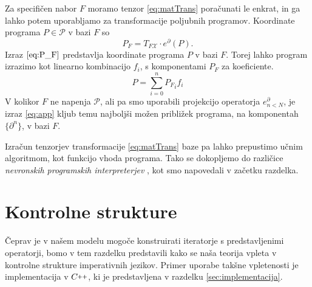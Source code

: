 \documentclass[a4paper, 12pt]{book}
\newcommand{\X}{\mathcal{X}}
\newcommand{\CC}{C\nolinebreak\hspace{-.05em}\raisebox{.4ex}{\tiny\bf +}\nolinebreak\hspace{-.10em}\raisebox{.4ex}{\tiny\bf +}}
\def\CC{{C\nolinebreak[4]\hspace{-.05em}\raisebox{.4ex}{\tiny\bf ++}}}
\newcommand{\dP}{\mathcal{P}}
\newcommand{\D}{\partial}
\begin{document}
Za specifičen nabor $F$ moramo tenzor \eqref{eq:matTrans} poračunati le enkrat, in ga lahko potem uporabljamo za transformacije poljubnih programov. Koordinate programa $P\in\dP$ v bazi $F$ so
\begin{equation}\label{eq:P_F}
  	P_F=T_{F\X}\cdot e^\D(P).
  \end{equation}
Izraz $\eqref{eq:P_F}$ predstavlja koordinate programa $P$ v bazi $F$. Torej lahko program izrazimo kot linearno kombinacijo $f_i$, s komponentami $P_F$ za koeficiente.
  \begin{equation}\label{eq:app}
  P=\sum\limits_{i=0}^{n}{P_F}_if_i
  \end{equation}
  V kolikor $F$ ne napenja $\dP$, ali pa smo uporabili projekcijo operatorja $e^\D_{n<N}$, je izraz \eqref{eq:app} kljub temu najboljši možen približek programa, na komponentah $\{\D^n\}$, v bazi $F$.

Izračun tenzorjev transformacije \eqref{eq:matTrans} baze pa lahko prepustimo učnim algoritmom, kot funkcijo vhoda programa. Tako se dokopljemo do različice \emph{nevronskih programskih interpreterjev} \cite{progInterp}, kot smo napovedali v začetku razdelka.
 
\section{Kontrolne strukture}

Čeprav je v našem modelu mogoče konstruirati iteratorje s predstavljenimi operatorji, bomo v tem razdelku predstavili kako se naša teorija vpleta v kontrolne strukture imperativnih jezikov. Primer uporabe takšne vpletenosti je implementacija v $\CC$, ki je predstavljena v razdelku \ref{sec:implementacija}.
\end{document}
